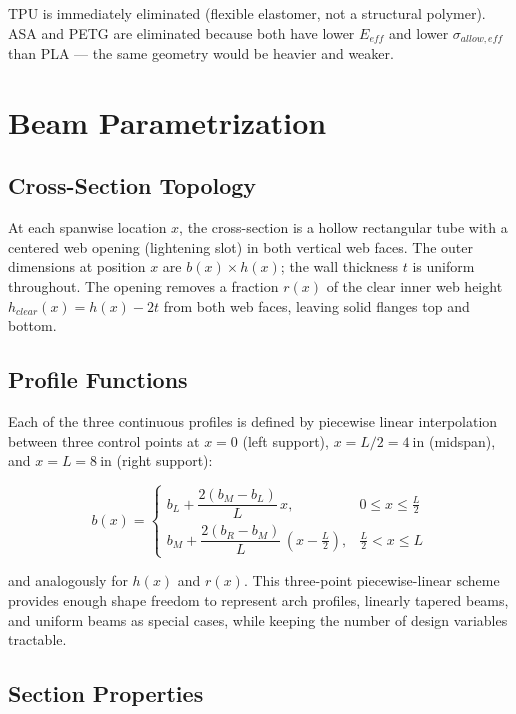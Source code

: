 \documentclass[11pt,letterpaper]{article}
\begin{document}
TPU is immediately eliminated (flexible elastomer, not a structural polymer).
ASA and PETG are eliminated because both have lower $E_{eff}$ and lower
$\sigma_{allow,eff}$ than PLA --- the same geometry would be heavier and weaker.


\section{Beam Parametrization}
\label{sec:parametrization}

\subsection{Cross-Section Topology}

At each spanwise location $x$, the cross-section is a hollow rectangular tube
with a centered web opening (lightening slot) in both vertical web faces.
The outer dimensions at position $x$ are $b(x) \times h(x)$; the wall
thickness $t$ is uniform throughout.  The opening removes a fraction $r(x)$
of the clear inner web height $h_{clear}(x) = h(x) - 2t$ from both web faces,
leaving solid flanges top and bottom.

\subsection{Profile Functions}

Each of the three continuous profiles is defined by piecewise linear
interpolation between three control points at $x = 0$ (left support),
$x = L/2 = 4\ \mathrm{in}$ (midspan), and $x = L = 8\ \mathrm{in}$
(right support):

\[
  b(x) = \begin{cases}
    b_L + \dfrac{2(b_M - b_L)}{L}\,x, & 0 \le x \le \tfrac{L}{2} \\[6pt]
    b_M + \dfrac{2(b_R - b_M)}{L}\,(x - \tfrac{L}{2}), & \tfrac{L}{2} < x \le L
  \end{cases}
\]

and analogously for $h(x)$ and $r(x)$.  This three-point piecewise-linear
scheme provides enough shape freedom to represent arch profiles, linearly
tapered beams, and uniform beams as special cases, while keeping the number
of design variables tractable.

\subsection{Section Properties}
\end{document}
